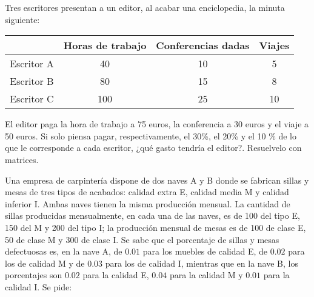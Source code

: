 


\begin{ejer} 
Tres escritores presentan a un editor, al acabar una enciclopedia, la minuta siguiente:

\begin{center}
\begin{tabular}{|c|c|c|c|} 
\hline
&Horas de trabajo & Conferencias dadas & Viajes \\
\hline
Escritor A & 40 & 10 & 5 \\ 
\hline
Escritor B & 80 & 15 & 8 \\
\hline
Escritor C & 100 & 25 & 10 
\\
\hline
\end{tabular}
\end{center}

El editor paga la hora de trabajo a 75 euros, la conferencia a 30 euros y el viaje a 50 euros. Si solo piensa pagar, respectivamente, el 30\%, el 20\% y el 10 \% de lo que le corresponde a cada escritor, ¿qué gasto tendría el editor?. Resuelvelo con matrices.
\begin{solu}
\end{solu}
\end{ejer}

\begin{ejer} 
 Una empresa de carpintería dispone de dos naves A y B donde se fabrican sillas y mesas de tres tipos de acabados: calidad extra E, calidad media M y calidad inferior I. Ambas naves tienen la misma producción mensual. La cantidad de sillas producidas mensualmente, en cada una de las naves, es de 100 del tipo E, 150 del M y 200 del tipo I; la producción mensual de mesas es de 100 de clase E, 50 de clase M y 300 de clase I. Se sabe que el porcentaje de sillas y mesas defectuosas es, en la nave A, de $0.01$ para los muebles de calidad E, de $0.02$ para los de calidad M y de $0.03$ para los de calidad I, mientras que en la nave B, los porcentajes son $0.02$ para la calidad E, $0.04$ para la calidad M y $0.01$ para la calidad I. Se pide:
\bex
{}
\eex

\end{ejer}

